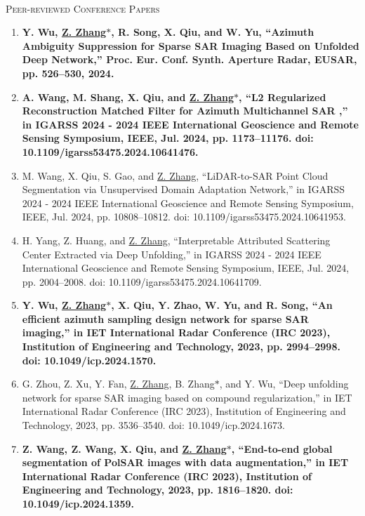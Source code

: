 \documentclass[paper=a4,fontsize=11pt]{scrartcl}
\begin{document}
~\\

\textsc{Peer-reviewed Conference Papers}

\begin{enumerate}
	
\item \textbf{Y. Wu, \underline{Z. Zhang$\ast$}, R. Song, X. Qiu, and W. Yu, ``Azimuth Ambiguity Suppression for Sparse SAR Imaging Based on Unfolded Deep Network,'' Proc. Eur. Conf. Synth. Aperture Radar, EUSAR, pp. 526–530, 2024.}

\item \textbf{A. Wang, M. Shang, X. Qiu, and \underline{Z. Zhang$\ast$}, ``L2 Regularized Reconstruction Matched Filter for Azimuth Multichannel SAR ,'' in IGARSS 2024 - 2024 IEEE International Geoscience and Remote Sensing Symposium, IEEE, Jul. 2024, pp. 1173–11176. doi: 10.1109/igarss53475.2024.10641476.}

\item M. Wang, X. Qiu, S. Gao, and \underline{Z. Zhang}, ``LiDAR-to-SAR Point Cloud Segmentation via Unsupervised Domain Adaptation Network,'' in IGARSS 2024 - 2024 IEEE International Geoscience and Remote Sensing Symposium, IEEE, Jul. 2024, pp. 10808–10812. doi: 10.1109/igarss53475.2024.10641953.

\item H. Yang, Z. Huang, and \underline{Z. Zhang}, ``Interpretable Attributed Scattering Center Extracted via Deep Unfolding,'' in IGARSS 2024 - 2024 IEEE International Geoscience and Remote Sensing Symposium, IEEE, Jul. 2024, pp. 2004–2008. doi: 10.1109/igarss53475.2024.10641709.
	
\item \textbf{Y. Wu, \underline{Z. Zhang$\ast$}, X. Qiu, Y. Zhao, W. Yu, and R. Song, ``An efficient azimuth sampling design network for sparse SAR imaging,'' in IET International Radar Conference (IRC 2023), Institution of Engineering and Technology, 2023, pp. 2994–2998. doi: 10.1049/icp.2024.1570.}

\item G. Zhou, Z. Xu, Y. Fan, \underline{Z. Zhang}, B. Zhang$\ast$, and Y. Wu, ``Deep unfolding network for sparse SAR imaging based on compound regularization,'' in IET International Radar Conference (IRC 2023), Institution of Engineering and Technology, 2023, pp. 3536–3540. doi: 10.1049/icp.2024.1673.

\item \textbf{Z. Wang, Z. Wang, X. Qiu, and \underline{Z. Zhang$\ast$}, ``End-to-end global segmentation of PolSAR images with data augmentation,'' in IET International Radar Conference (IRC 2023), Institution of Engineering and Technology, 2023, pp. 1816–1820. doi: 10.1049/icp.2024.1359.}


\end{enumerate}
\end{document}
